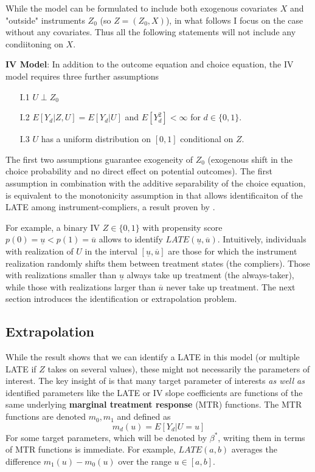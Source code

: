 \documentclass{article}
\begin{document}
While the model can be formulated to include both exogenous covariates $X$ and "outside" instruments $Z_0$ (so $Z=(Z_0,X)$), in what follows I focus on the case without any covariates. 
Thus all the following statements will not include any condiitoning on $X$.

\textbf{IV Model}: In addition to the outcome equation and choice equation, the IV model requires three further assumptions
\begin{itemize}
    \item[I.1] $U\perp Z_0$
    \item[I.2] $E[Y_d|Z,U] = E[Y_d|U]$ and $E[Y_d^2]<\infty$ for $d\in\{0,1\}$.
    \item[I.3] $U$ has a uniform distribution on $[0,1]$ conditional on $Z$. 
\end{itemize}
The first two assumptions guarantee exogeneity of $Z_0$ (exogenous shift in the choice probability and no direct effect on potential outcomes).
The first assumption in combination with the additive separability of the choice equation, is equivalent to the monotonicity assumption in \citet{angrist1996identification} that allows identificaiton of the LATE among instrument-compliers, a result proven by \citet{vytlacil2002independence}.

For example, a binary IV $Z\in\{0,1\}$ with propensity score $p(0) = \underline{u} < p(1) = \overline{u}$ allows to identify $LATE(\underline{u},\overline{u})$.
Intuitively, individuals with realization of $U$ in the interval $[\underline{u}, \overline{u}]$ are those for which the instrument realization randomly shifts them between treatment states (the compliers).
Those with realizations smaller than $\underline{u}$ always take up treatment (the always-taker), while those with realizations larger than $\overline{u}$ never take up treatment.
The next section introduces the identification or extrapolation problem.

\subsection{Extrapolation}
While the \citet{imbens1994identification} result shows that we can identify a LATE in this model (or multiple LATE if $Z$ takes on several values), these might not necessarily the parameters of interest.
The key insight of \citet{mogstad2018using} is that many target parameter of interests \textit{as well as} identified parameters like the LATE or IV slope coefficients are functions of the same underlying \textbf{marginal treatment response} (MTR) functions.
The MTR functions are denoted $m_0, m_1$ and defined as 
\begin{equation}
    m_d(u) = E[Y_d|U=u]
\end{equation}
For some target parameters, which will be denoted by $\beta^*$, writing them in terms of MTR functions is immediate. 
For example, $LATE(a,b)$ averages the difference $m_1(u) - m_0(u)$ over the range $u\in[a,b]$.
\end{document}
